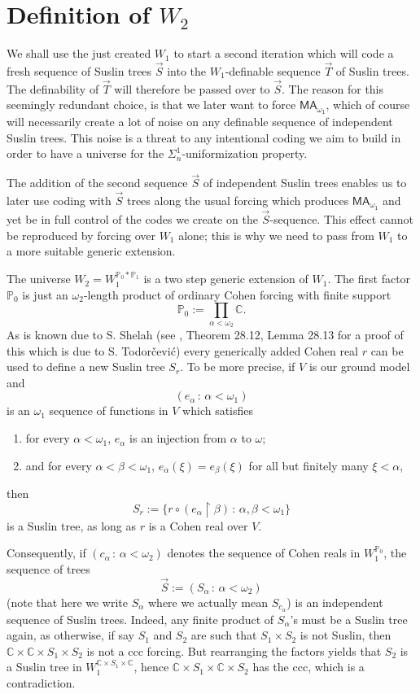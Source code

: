 \documentclass[a4paper,11pt]{article}
\newcommand{\forceP}{\mathbb{P}}
\newcommand{\MA}{\mathsf{MA_{\omega_1}}}
\begin{document}
\section{Definition of $W_2$}
We shall use the just created $W_1$ to start a second iteration which will code a fresh sequence of Suslin trees $\vec{S}$ into the $W_1$-definable sequence $\vec{T}$ of Suslin trees. The definability of $\vec{T}$ will therefore be passed over to $\vec{S}$.
The reason for this seemingly redundant choice, is that we later want to force $\MA$, which of course will necessarily create a lot of noise on any definable sequence of independent Suslin trees. This noise is a threat to any intentional coding we aim to build in order to have a universe for the $\Sigma^1_n$-uniformization property.

The addition of the second sequence $\vec{S}$ of independent Suslin trees enables us to later use coding with $\vec{S}$ trees along the usual forcing which produces $\MA$ and yet be in full control of the codes we create on the $\vec{S}$-sequence. This effect cannot be reproduced by forcing over $W_1$ alone; this is why we need to pass from $W_1$ to a more suitable generic extension.

The universe $W_2=W_1^{\forceP_0 \ast \forceP_1}$ is a two step generic extension of $W_1$. The first factor $\forceP_0$ is just an $\omega_2$-length product of ordinary Cohen forcing with finite support
\[\forceP_0:= \prod_{\alpha < \omega_2} \mathbb{C}. \]
As is known due to S. Shelah (see \cite{Jech}, Theorem 28.12, Lemma 28.13 for a proof of this {which is due to S. Todor\v cevi\'c}) every generically added Cohen real $r$ can be used to define a new Suslin tree $S_r$. To be more precise, if $V$ is our ground model and
\[ (e_{\alpha} \, : \, \alpha < \omega_1) \] is an $\omega_1$ sequence of functions in $V$ which satisfies
\begin{enumerate}
\item for every $\alpha < \omega_1$, $e_{\alpha}$ is an injection from $\alpha$ to $\omega$;
\item and for every $\alpha < \beta < \omega_1$, $e_{\alpha} (\xi)=e_{\beta} (\xi)$ for all but finitely many $\xi < \alpha$,
\end{enumerate}
then
\[ S_r :=\{ r \circ (e_{\alpha} \upharpoonright \beta) \, : \, \alpha,\beta < \omega_1\} \]
 is a Suslin tree, as long as $r$ is a Cohen real over $V$.
 
 Consequently, if $(c_{\alpha} \, : \, \alpha < \omega_2)$ denotes the sequence of Cohen reals in $W_1^{\forceP_0}$, the sequence of trees 
 \[\vec{S}:=(S_{{\alpha}} \, : \, \alpha < \omega_2) \] {(note that here we write $S_{\alpha}$ where we actually mean $S_{c_{\alpha}}$)}
 is an independent sequence of Suslin trees. Indeed, any finite product of $S_{\alpha}$'s must be a Suslin tree again, as otherwise, if say $S_1$ and $S_2$ are such that $S_1 \times S_2$ is not Suslin, then $\mathbb{C} \times \mathbb{C} \times S_1 \times S_2$ is not a ccc forcing. But rearranging the factors yields that $S_2$ is a Suslin tree in $W_1^{\mathbb{C} \times S_1 \times \mathbb{C}}$, hence $\mathbb{C} \times S_1 \times \mathbb{C} \times S_2$ has the ccc, which is a contradiction.
 
\end{document}
